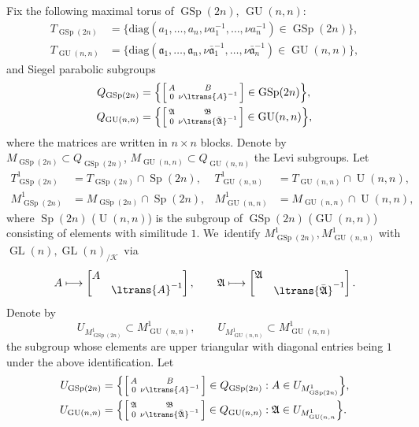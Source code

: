 \documentclass[JEP,XML,SOM,Unicode,published]{cedram}
\newenvironment{Smallbmatrix}{\Big[\begin{smallmatrix}}{\end{smallmatrix}\Big]}
\newcommand\mto{\mathchoice{\longmapsto}{\mapsto}{\mapsto}{\mapsto}}
\theoremstyle{plain}
\theoremstyle{remark}
\newcommand{\cK}{\mathcal{K}}
\newcommand{\fa}{\mathfrak{a}}
\newcommand{\fA}{\mathfrak{A}}
\newcommand{\fB}{\mathfrak{B}}
\DeclareMathOperator{\GL}{GL}
\DeclareMathOperator{\GSp}{GSp}
\DeclareMathOperator{\GU}{GU}
\DeclareMathOperator{\U}{U}
\DeclareMathOperator{\Sp}{Sp}
\newcommand{\diag}{\mathrm{diag}}
\begin{document}
Fix the following maximal torus of $\GSp(2n)$, $\GU(n,n)$:
\begin{align*}
T_{\GSp(2n)}&=\bigl\{\diag(a_1,\dots,a_n,\nu a^{-1}_1,\dots,\nu a^{-1}_n)\in\GSp(2n)\bigr\},\\
T_{\GU(n,n)}&=\bigl\{\diag(\fa_1,\dots,\fa_n,\nu \bar{\fa}^{-1}_1,\dots,\nu \bar{\fa}^{-1}_n)\in\GU(n,n)\bigr\},
\end{align*}
and Siegel parabolic subgroups
\begin{equation}\label{eq:Q}
\begin{aligned}
Q_{\GSp(2n)}&=\Bigl\{\begin{Smallbmatrix} A&B\\0&\nu \ltrans{A}^{-1}\end{Smallbmatrix}\in \GSp(2n) \Bigr\},\\
Q_{\GU(n,n)}&= \Bigl\{\begin{Smallbmatrix} \fA&\fB\\0&\nu \ltrans{\bar{\fA}}^{-1}\end{Smallbmatrix}\in \GU(n,n) \Bigr\},
\end{aligned}
\end{equation}
where the matrices are written in $n\times n$ blocks. Denote by $M_{\GSp(2n)}\subset Q_{\GSp(2n)}$, $M_{\GU(n,n)}\subset Q_{\GU(n,n)}$ the Levi subgroups. Let
\begin{align*}
T^1_{\GSp(2n)}&=T_{\GSp(2n)}\cap \Sp(2n),
&T^1_{\GU(n,n)}&=T_{\GU(n,n)}\cap \U(n,n),\\
M^1_{\GSp(2n)}&=M_{\GSp(2n)}\cap \Sp(2n),
&M^1_{\GU(n,n)}&=M_{\GU(n,n)}\cap \U(n,n),
\end{align*}
where $\Sp(2n)$ (\resp $\U(n,n)$) is the subgroup of $\GSp(2n)$ (\resp $\GU(n,n)$) consisting of elements with similitude $1$. We~identify $M^1_{\GSp(2n)},M^1_{\GU(n,n)}$ with $\GL(n),\GL(n)_{/\cK}$~via
\[
A\mto \begin{bmatrix} A\\&\ltrans{A}^{-1}\end{bmatrix},\qquad
\fA\mto \begin{bmatrix} \fA\\&\ltrans{\bar{\fA}}^{-1}\end{bmatrix}.
\]
Denote by
\[
U_{M^1_{\GSp(2n)}}\subset M^1_{\GU(n,n)},\qquad
U_{M^1_{\GU(n,n)}}\subset M^1_{\GU(n,n)}
\]
the subgroup whose elements are upper triangular with diagonal entries being $1$ under the above identification. Let
\begin{align*}
U_{\GSp(2n)}&= \Bigl\{\begin{Smallbmatrix} A&B\\0&\nu \ltrans{A}^{-1}\end{Smallbmatrix}\in Q_{\GSp(2n)}:A\in U_{M^1_{\GSp(2n)}} \Bigr\},\\
U_{\GU(n,n)}&= \Bigl\{\begin{Smallbmatrix} \fA&\fB\\0&\nu \ltrans{\bar{\fA}}^{-1}\end{Smallbmatrix}\in Q_{\GU(n,n)}:\fA\in U_{M^1_{\GU(n,n}} \Bigr\}.
\end{align*}
\end{document}
